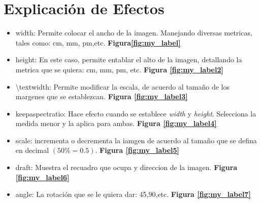 \documentclass{article}
\begin{document}
\section{Explicación de Efectos}
\begin{itemize}
    \item width: Permite colocar el ancho de la imagen. Manejando diversas metricas, tales como: cm, mm, pm,etc. \textbf{Figura\ref{fig:my_label}} 
    \item height: En este caso, permite entablar el alto de la imagen, detallando la metrica que se quiera: cm, mm, pm, etc. \textbf{Figura \ref{fig:my_label2}} 
    \item \textbackslash{}textwidth: Permite modificar la escala, de acuerdo al tamaño de los margenes que se establezcan. \textbf{Figura \ref{fig:my_label3}} 
    \item keepaspectratio: Hace efecto cuando se establece \textit{width} y \textit{height}. Selecciona la medida menor y la aplica para ambas. \textbf{Figura \ref{fig:my_label4}} 
    \item scale: incrementa o decrementa la iamgen de acuerdo al tamaño que se defina en decimal $(50\%=0.5)$. \textbf{Figura \ref{fig:my_label5}} 
    \item draft: Muestra el recuadro que ocupa y direccion de la imagen. \textbf{Figura \ref{fig:my_label6}} 
    \item angle: La rotación que se le quiera dar: 45,90,etc. \textbf{Figura \ref{fig:my_label7}} 
\end{itemize}
\end{document}
